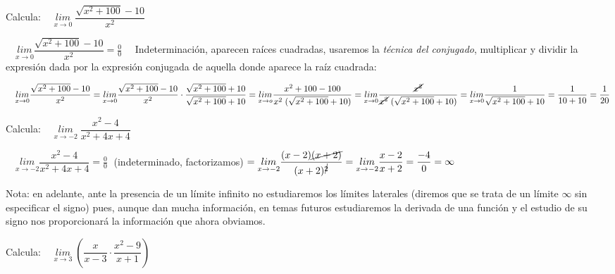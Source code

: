 	\begin{ejre} Calcula: $\quad \underset {x\to 0}{lim}\; {\dfrac {\sqrt{x^2+100}-10}{x^2}}$
		
	\end{ejre}
	
	\begin{proofw}\renewcommand{\qedsymbol}{$\diamond$}

	$\quad \underset {x\to 0}{lim}{\dfrac {\sqrt{x^2+100}-10}{x^2}}=\frac 0 0\quad$ Indeterminación, aparecen raíces cuadradas, usaremos la \emph{técnica del conjugado}, multiplicar y dividir la expresión dada por la expresión conjugada de aquella donde aparece la raíz cuadrada:
	
	$\quad \underset {x\to 0}{lim}{\dfrac {\sqrt{x^2+100}-10}{x^2}}= \underset {x\to 0}{lim}{\dfrac {\sqrt{x^2+100}-10}{x^2}}\cdot \dfrac{\sqrt{x^2+100}+10}{\sqrt{x^2+100}+10} = \underset {x\to o}{lim}{\dfrac {x^2+100-100}{x^2\; (\sqrt{x^2+100}+10)}}= 
	\underset {x\to 0}{lim}{\dfrac {\cancel{x^2}}{\cancel{x^2}\; (\sqrt{x^2+100}+10)}}=\underset {x\to 0}{lim}{\dfrac 1 {\sqrt{x^2+100}+10}}=\dfrac 1 {10+10}=\dfrac 1 {20}$ 
	\end{proofw}
	
	\begin{ejre} Calcula: $\quad \underset {x \to -2}{lim}\; {\dfrac {x^2-4}{x^2+4x+4}} $
		
	\end{ejre}
	\begin{proofw}\renewcommand{\qedsymbol}{$\diamond$}
	
	$\quad \underset {x \to -2}{lim}{\dfrac {x^2-4}{x^2+4x+4}} = \frac 0 0\; $ (indeterminado, factorizamos) 	
	$= \underset {x \to -2}{lim}{\dfrac {(x-2) \cancel{(x+2)}}{(x+2)^ {\cancel{2}}}} = \underset {x \to -2}{lim} {\dfrac {x-2}{x+2}} = \dfrac {-4}{0}=\infty $  

	\end{proofw}
	
	Nota: en adelante, ante la presencia de un límite infinito no estudiaremos los límites laterales (diremos que se trata de un límite $\infty$ sin especificar el signo) pues, aunque dan mucha información, en temas futuros estudiaremos la derivada de una función y el estudio de su signo nos proporcionará la información que ahora obviamos. 
	
	\begin{ejre} Calcula: $\quad \underset {x \to 3}{lim}\; \left({\dfrac {x}{x-3} \cdot \dfrac {x^2-9}{x+1}}\right)$	
	\end{ejre}
	
